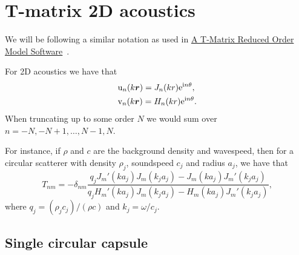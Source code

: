 \documentclass[ 12pt, a4paper]{article}
\begin{document}
\section{T-matrix 2D acoustics}

We will be following a similar notation as used in \href{a9-ganesh.pdf}{A T-Matrix Reduced Order
Model Software}~\parencite{ganesh_far-field_2010,ganesh_algorithm_2017}.

For 2D acoustics we have that
\begin{align}
  & \mathrm u_{n}(k\boldsymbol{r}) = J_{n}(k r) \mathrm{e}^{\mathrm{i} n \theta},
  \\
  & \mathrm v_{n}(k\boldsymbol{r})= H_{n}(k r) \mathrm{e}^{\mathrm{i} n \theta}.
\end{align}
When truncating up to some order $N$ we would sum over $n = -N, -N +1, \ldots, N-1, N$.

For instance, if $\rho$ and $c$ are the background density and wavespeed, then for a circular scatterer with density $\rho_j$, soundspeed $c_j$ and radius $a_j$, we have that
\begin{equation}
  T_{nm} = - \delta_{nm} \frac{q_j J_m' (k a_j) J_m (k_j a_j) - J_m (k a_j) J_m' (k_j a_j) }{q_j H_m '(k a_j) J_m(k_j a_j) - H_m(k a_j) J_m '(k_j a_j)},
  \label{eqn:circular_t-matrix}
\end{equation}
where $q_j = (\rho_j c_j)/(\rho c)$ and $k_j = \omega/c_j$.

\subsection{Single circular capsule}

\begin{figure}[t]
\centering

  \label{fig:capsule}
\end{figure}
\end{document}
